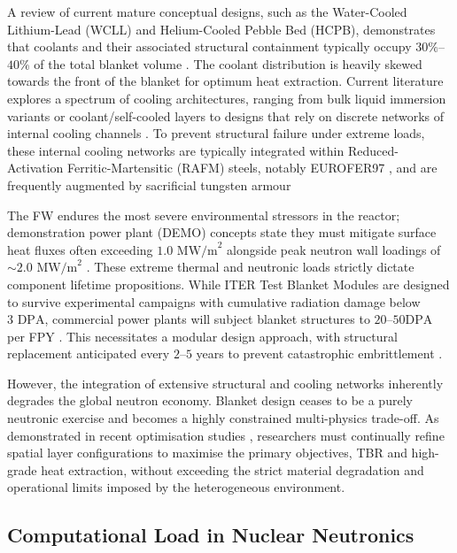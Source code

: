 \documentclass[11pt]{article}
\begin{document}
A review of current mature conceptual designs, such as the Water-Cooled Lithium-Lead (WCLL) and
Helium-Cooled Pebble Bed (HCPB), demonstrates that coolants and their associated structural
containment typically occupy $30\%$--$40\%$ of the total blanket volume \citep{del_nevo_wcll_2019}.
The coolant distribution is heavily skewed towards the front of the blanket for optimum heat
extraction. Current literature explores a spectrum of cooling architectures, ranging from bulk
liquid immersion variants or coolant/self-cooled layers \citep{lord_fusing_2024, sorbom_arc_2015,
segantin_optimisation_2020, kirillov1998} to designs that rely on discrete networks of internal
cooling channels \citep{federici_overview_2019, zhuang_progress_2019, lee2012, qu2020}. To prevent
structural failure under extreme loads, these internal cooling networks are typically integrated
within Reduced-Activation Ferritic-Martensitic (RAFM) steels, notably EUROFER97
\citep{stornelli_ultra-fine_2024}, and are frequently augmented by sacrificial tungsten armour
\citep{you_european_2016}

The FW endures the most severe environmental stressors in the reactor; demonstration power plant
(DEMO) concepts state they must mitigate surface heat fluxes often exceeding $1.0\text{ MW/m}^2$
alongside peak neutron wall loadings of $\sim 2.0\text{ MW/m}^2$ \citep{you_european_2016}. These
extreme thermal and neutronic loads strictly dictate component lifetime propositions. While ITER
Test Blanket Modules are designed to survive experimental campaigns with cumulative radiation damage
below $3\text{ DPA}$, commercial power plants will subject blanket structures to $20$--$50\text{
DPA}$ per FPY \citep{federici_european_2017}. This necessitates a modular design approach, with
structural replacement anticipated every $2$--$5$ years to prevent catastrophic embrittlement
\citep{boccaccini_demo_2014}.

However, the integration of extensive structural and cooling networks inherently degrades the global
neutron economy. Blanket design ceases to be a purely neutronic exercise and becomes a highly
constrained multi-physics trade-off. As demonstrated in recent optimisation studies
\citep{qiu_neutronic_2018}, researchers must continually refine spatial layer configurations to
maximise the primary objectives, TBR and high-grade heat extraction, without exceeding the strict
material degradation and operational limits imposed by the heterogeneous environment.

\subsection{Computational Load in Nuclear Neutronics}
\label{sec:computational_load}
\end{document}
